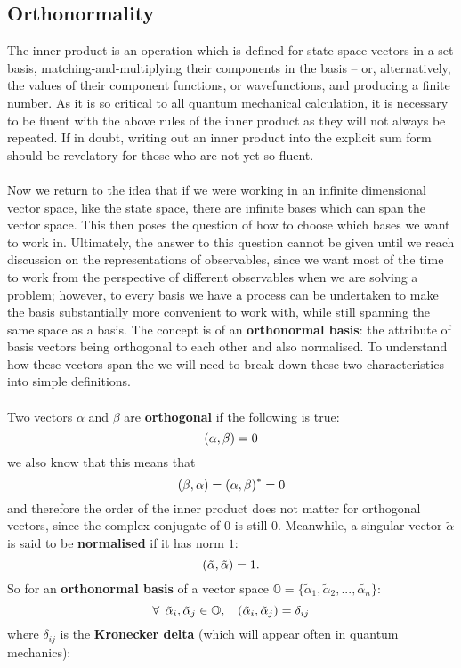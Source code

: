 \subsection{Orthonormality}
The inner product is an operation which is defined for state space vectors in a set basis, matching-and-multiplying their components in the basis -- or, alternatively, the values of their component functions, or wavefunctions, and producing a finite number. As it is so critical to all quantum mechanical calculation, it is necessary to be fluent with the above rules of the inner product as they will not always be repeated. If in doubt, writing out an inner product into the explicit sum form should be revelatory for those who are not yet so fluent.
\\\\
Now we return to the idea that if we were working in an infinite dimensional vector space, like the state space, there are infinite bases which can span the vector space. This then poses the question of how to choose which bases we want to work in. Ultimately, the answer to this question cannot be given until we reach discussion on the representations of observables, since we want most of the time to work from the perspective of different observables when we are solving a problem; however, to every basis we have a process can be undertaken to make the basis substantially more convenient to work with, while still spanning the same space as a basis. The concept is of an \textbf{orthonormal basis}: the attribute of basis vectors being orthogonal to each other and also normalised. To understand how these vectors span the  we will need to break down these two characteristics into simple definitions.
\\\\
Two  vectors $\alpha$ and $\beta$ are \textbf{orthogonal} if the following is true:
$$
\left(\alpha,\beta\right) =  0
$$
we also know that this means that
$$
\left(\beta,\alpha\right) = \left(\alpha,\beta\right)^{\ast} = 0
$$
and therefore the order of the inner product does not matter for orthogonal vectors, since the complex conjugate of $0$ is still $0$. Meanwhile, a singular vector $\tilde{\alpha}$ is said to be \textbf{normalised} if it has norm $1$:
$$
\left(\tilde{\alpha},\tilde{\alpha}\right) = 1.
$$
So for an \textbf{orthonormal basis} of a vector space $\mathbb{O}=\{\tilde{\alpha}_{1},\tilde{\alpha}_{2},...,\tilde{\alpha_{n}}\}$:
$$
\forall\:\: \tilde{\alpha}_{i},\tilde{\alpha}_{j} \in \mathbb{O}, \:\:\:\:
\left(\tilde{\alpha}_{i},\tilde{\alpha}_{j}\right)= \delta_{ij}
$$
where $\delta_{ij}$ is the \textbf{Kronecker delta} (which will appear often in quantum mechanics): 
